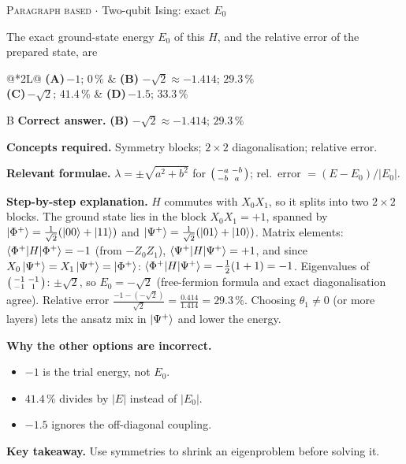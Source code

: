 \documentclass[11pt,a4paper]{article}
\newcommand{\optlabel}[1]{\textbf{(#1)}}
\newcommand{\correctlabel}[1]{\textcolor{okgreen}{\textbf{(#1)}\,\ding{51}}}
\newenvironment{qitem}[1]{\begin{list}{}{\setlength{\leftmargin}{3.3em}\setlength{\labelwidth}{3.1em}%
  \setlength{\labelsep}{0.2em}\setlength{\topsep}{3pt}\setlength{\parsep}{3pt}}\item[\textbf{Q.#1}\hfill]}{\end{list}}
\newcommand{\qsep}{\par\vspace{2pt}{\color{black!15}\hrule}\vspace{4pt}}
\newcommand{\qmeta}[2]{{\footnotesize\color{black!60}\textsc{#1} \;$\cdot$\; #2}\par}
\begin{document}
\begin{qitem}{37}
\qmeta{Paragraph based}{Two-qubit Ising: exact $E_0$}
The exact ground-state energy $E_0$ of this $H$, and the relative error of the prepared state, are
\par\smallskip\noindent\begin{tabularx}{\linewidth}{@{}*{2}{L}@{}}
\optlabel{A}\,$-1$; $0\,\%$ & \correctlabel{B}\,$-\sqrt2 \approx -1.414$; $29.3\,\%$ \\[3pt]
\optlabel{C}\,$-\sqrt2$; $41.4\,\%$ & \optlabel{D}\,$-1.5$; $33.3\,\%$
\end{tabularx}
\end{qitem}
\begin{solbox}{B}
\textbf{\color{brand}Correct answer.} \textcolor{okgreen}{\textbf{(B)}} $-\sqrt2 \approx -1.414$; $29.3\,\%$

\textbf{\color{brand}Concepts required.} Symmetry blocks; $2\times2$ diagonalisation; relative error.

\textbf{\color{brand}Relevant formulae.} $\lambda = \pm\sqrt{a^2 + b^2}$ for $\begin{psmallmatrix}-a&-b\\-b&a\end{psmallmatrix}$; rel.\ error $= (E - E_0)/|E_0|$.

\textbf{\color{brand}Step-by-step explanation.} $H$ commutes with $X_0X_1$, so it splits into two $2\times2$ blocks. The ground state lies in the block $X_0X_1 = +1$, spanned by
$\ket{\Phi^+} = \frac{1}{\sqrt2}(\ket{00} + \ket{11})$ and $\ket{\Psi^+} = \frac{1}{\sqrt2}(\ket{01} + \ket{10})$. Matrix elements: $\braket{\Phi^+|H|\Phi^+} = -1$ (from $-Z_0Z_1$),
$\braket{\Psi^+|H|\Psi^+} = +1$, and since $X_0\ket{\Psi^+} = X_1\ket{\Psi^+} = \ket{\Phi^+}$: $\braket{\Phi^+|H|\Psi^+} = -\tfrac12(1 + 1) = -1$. Eigenvalues of $\begin{psmallmatrix}-1&-1\\-1&1\end{psmallmatrix}$: $\pm\sqrt2$, so $E_0 = -\sqrt2$
(free-fermion formula and exact diagonalisation agree). Relative error $\frac{-1 - (-\sqrt2)}{\sqrt2} = \frac{0.414}{1.414} = 29.3\,\%$.
Choosing $\theta_1 \neq 0$ (or more layers) lets the ansatz mix in $\ket{\Psi^+}$ and lower the energy.

\textbf{\color{brand}Why the other options are incorrect.}
\begin{itemize}[leftmargin=2.4em, itemsep=1pt, topsep=2pt]
\item[\textbf{(A)}] $-1$ is the trial energy, not $E_0$.
\item[\textbf{(C)}] $41.4\,\%$ divides by $|E|$ instead of $|E_0|$.
\item[\textbf{(D)}] $-1.5$ ignores the off-diagonal coupling.
\end{itemize}
\textbf{\color{brand}Key takeaway.} Use symmetries to shrink an eigenproblem before solving it.
\end{solbox}
\qsep
\end{document}

